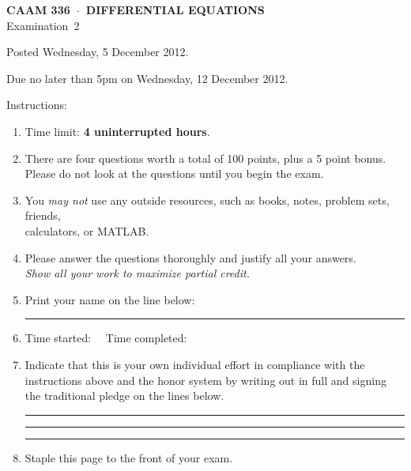 \documentclass[11pt]{article}
\begin{document}
\thispagestyle{empty}
\vspace*{0em}
   \begin{center}
      \textsf{\textbf{CAAM 336\ $\cdot$\ DIFFERENTIAL EQUATIONS}}\\[0.5em]
       \textsf{Examination~2}
   \end{center}

\vspace*{3em}

   Posted Wednesday, 5 December 2012. 

   Due no later than 5pm on Wednesday, 12 December 2012.

\vspace*{3em}
Instructions:
\begin{enumerate}
\item Time limit: \textbf{4 uninterrupted hours}.
\item There are four questions worth a total of 100 points, plus a 5 point bonus.\\
      Please do not look at the questions until you begin the exam.
\item You \emph{may not} use any outside resources,
      such as books, notes, problem sets, friends,\\
      calculators, or MATLAB. 
\item Please answer the questions thoroughly and justify all your answers.\\
      \emph{Show all your work to maximize partial credit.}

\item Print your name on the line below:

\vspace*{1em}\rule{6in}{0.5pt}

\item Time started: \hrulefill\ \ Time completed: \hrulefill

\item Indicate that this is your own individual effort in compliance with 
      the instructions above and the honor system by writing out in full 
      and signing the traditional pledge on the lines below.

\vspace*{1em}\rule{6in}{0.5pt}

\vspace*{1em}\rule{6in}{0.5pt}

\vspace*{1em}\rule{6in}{0.5pt}

\item Staple this page to the front of your exam.

\end{enumerate}
\end{document}
